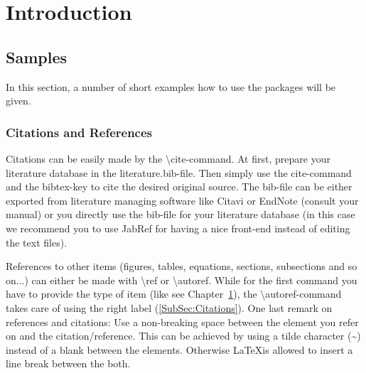 \chapter{Introduction}\label{Chap:Introduction}

\section{Samples}
In this section, a number of short examples how to use the packages will be given.

\subsection{Citations and References}\label{SubSec:Citations}
Citations can be easily made by the \textbackslash cite-command. At first, prepare your literature database in the literature.bib-file. Then simply use the cite-command and the bibtex-key to cite the desired original source. The bib-file can be either exported from literature managing software like Citavi or EndNote (consult your manual) or you directly use the bib-file for your literature database (in this case we recommend you to use JabRef for having a nice front-end instead of editing the text files).

References to other items (figures, tables, equations, sections, subsections and so on...) can either be made with \textbackslash ref or \textbackslash autoref. While for the first command you have to provide the type of item (like see Chapter~\ref{Chap:Introduction}), the \textbackslash autoref-command takes care of using the right label (\autoref{SubSec:Citations}). One last remark on references and citations: Use a non-breaking space between the element you refer on and the citation/reference. This can be achieved by using a tilde character (\textasciitilde) instead of a blank between the elements. Otherwise \LaTeX is allowed to insert a line break between the both.

